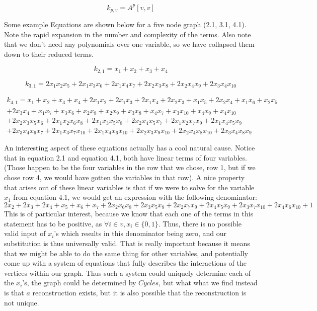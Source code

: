 $$k_{p, v} = A^p[v,v]$$

Some example Equations are shown below for a five node graph (2.1, 3.1, 4.1). 
Note the rapid expansion in the number and complexity of the terms.  
Also note that we don't need any polynomials over one variable, so we have collapsed them down to their reduced terms.

$$k_{2,1} = x_1 + x_2 + x_3 + x_4$$

$$k_{3,1} = 2x_1x_2x_5 + 2x_1x_3x_6 + 2x_1x_4x_7 + 2x_2x_3x_8 + 2x_2x_4x_9 + 2x_3x_4x_{10}$$

\begin{equation}\begin{aligned} k_{4,1} = x_1 + x_2 + x_3 + x_4 + 2x_1x_2 + 2x_1x_3 + 2x_1x_4 + 2x_2x_3 + x_1x_5 + 2x_2x_4 + x_1x_6 + x_2x_5 \\ + 2x_3x_4 + x_1x_7 + x_3x_6 + x_2x_8 + x_2x_9 + x_3x_8 + x_4x_7 + x_3x_{10} + x_4x_9 + x_4x_{10} \\ + 2x_2x_3x_5x_6 + 2x_1x_2x_6x_8 + 2x_1x_3x_5x_8 + 2x_2x_4x_5x_7 + 2x_1x_2x_7x_9 + 2x_1x_4x_5x_9 \\+ 2x_3x_4x_6x_7 + 2x_1x_3x_7x_{10} + 2x_1x_4x_6x_{10} + 2x_2x_3x_9x_{10} + 2x_2x_4x_8x_{10} + 2x_3x_4x_8x_9 \end{aligned}\end{equation}

An interesting aspect of these equations actually has a cool natural cause.  
Notice that in equation 2.1 and equation 4.1, both have linear terms of four variables.  
(Those happen to be the four variables in the row that we chose, row 1, but if we chose row 4, we would have gotten the variables in that row). 
A nice property that arises out of these linear variables is that if we were to solve for the variable $x_1$ from equation 4.1, we would get an expression with the following denominator: 
$$2x_2 + 2x_3 + 2x_4 + x_5 + x_6 + x_7 + 2x_2x_6x_8 + 2x_3x_5x_8 + 2x_2x_7x_9 + 2x_4x_5x_9 + 2x_3x_7x_{10} + 2x_4x_6x_{10} + 1$$
This is of particular interest, because we know that each one of the terms in this statement has to be positive, as $\forall i \in v,  x_i \in \{0, 1\}$.  
Thus, there is no possible valid input of $x_i$'s which results in this denominator being zero, and our substitution is thus universally valid.  
That is really important because it means that we might be able to do the same thing for other variables, and potentially come up with a system of equations that fully describes the interactions of the vertices within our graph. 
Thus such a system could uniquely determine each of the $x_i$'s, the graph could be determined by $Cycles$, but what what we find instead is that $a$ reconstruction exists, but it is also possible that the reconstruction is not unique.

